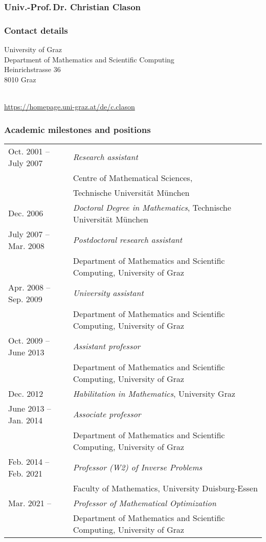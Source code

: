 \subsubsection*{Univ.-Prof.\,Dr. Christian Clason}
\label{cv:cclason}

\subsubsection*{Contact details}

University of Graz\\
Department of Mathematics and Scientific Computing\\
Heinrichstrasse 36\\
8010 Graz

\\
\url{https://homepage.uni-graz.at/de/c.clason}\\

\subsubsection*{Academic milestones and positions}

\enlargethispage{1cm}
\begin{tabularx}{\linewidth}{ll}
    Oct. 2001 -- July 2007 & \emph{Research assistant} \\
    & Centre of Mathematical Sciences, \\&Technische Universität München \\
    Dec. 2006 & \emph{Doctoral Degree in Mathematics}, Technische Universität München\\
    July  2007 -- Mar. 2008 & \emph{Postdoctoral research assistant}  \\
    & Department of Mathematics and Scientific Computing, University of Graz\\
    Apr.  2008 -- Sep. 2009 & \emph{University assistant}  \\
    & Department of Mathematics and Scientific Computing, University of Graz\\
    Oct.  2009 -- June 2013 & \emph{Assistant professor} \\
    & Department of Mathematics and Scientific Computing, University of Graz\\
    Dec. 2012 & \emph{Habilitation in Mathematics}, University Graz\\
    June  2013 -- Jan. 2014 & \emph{Associate professor} \\
    & Department of Mathematics and Scientific Computing, University of Graz\\
    Feb.  2014 -- Feb. 2021  & \emph{Professor (W2) of Inverse Problems}\\
    & Faculty of Mathematics, University Duisburg-Essen\\
    Mar.  2021 -- & \emph{Professor of Mathematical Optimization} \\
    & Department of Mathematics and Scientific Computing, University of Graz \\
\end{tabularx}

